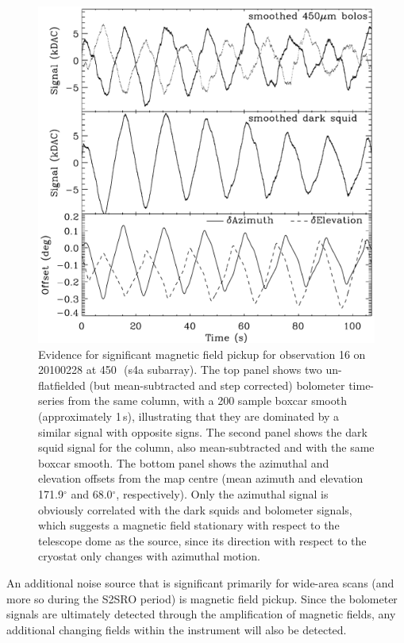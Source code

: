 \documentclass[useAMS,usenatbib,nofootinbib]{mn2e}
\begin{document}
\begin{figure}
\centering
\includegraphics[width=\linewidth]{magpickup}
\caption{Evidence for significant magnetic field pickup for
  observation 16 on 20100228 at 450\,\micron\ (s4a subarray).  The top
  panel shows two un-flatfielded (but mean-subtracted and step
  corrected) bolometer time-series from the same column, with a 200
  sample boxcar smooth (approximately 1\,s), illustrating that they
  are dominated by a similar signal with opposite signs. The second
  panel shows the dark squid signal for the column, also
  mean-subtracted and with the same boxcar smooth. The bottom panel
  shows the azimuthal and elevation offsets from the map centre (mean
  azimuth and elevation 171.9$^\circ$ and 68.0$^\circ$,
  respectively). Only the azimuthal signal is obviously correlated
  with the dark squids and bolometer signals, which suggests a
  magnetic field stationary with respect to the telescope dome as the
  source, since its direction with respect to the cryostat only
  changes with azimuthal motion.}
\label{fig:magpickup}
\end{figure}

An additional noise source that is significant primarily for wide-area
scans (and more so during the S2SRO period) is magnetic field
pickup. Since the bolometer signals are ultimately detected through
the amplification of magnetic fields, any additional changing fields
within the instrument will also be detected.
\end{document}
